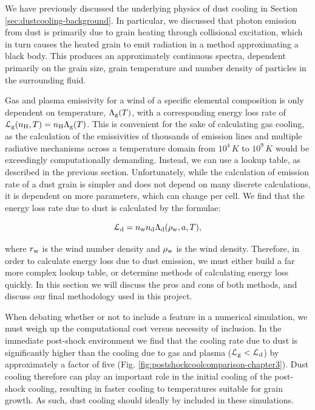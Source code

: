 We have previously discussed the underlying physics of dust cooling in Section \ref{sec:dustcooling-background}.
In particular, we discussed that photon emission from dust is primarily due to grain heating through collisional excitation, which in turn causes the heated grain to emit radiation in a method approximating a black body.
This produces an approximately continuous spectra, dependent primarily on the grain size, grain temperature and number density of particles in the surrounding fluid.

Gas and plasma emissivity for a wind of a specific elemental composition is only dependent on temperature, $\Lambda_\text{g}(T)$, with a corresponding energy loss rate of $\mathcal{L}_\text{g} (n_\text{H},T) = n_\text{H} \Lambda_\text{g}(T)$. 
This is convenient for the sake of calculating gas cooling, as the calculation of the emissivities of thousands of emission lines and multiple radiative mechanisms across a temperature domain from $10^4\, \si{K}$ to $10^9\,\si{K}$ would be exceedingly computationally demanding.
Instead, we can use a lookup table, as described in the previous section.
Unfortunately, while the calculation of emission rate of a dust grain is simpler and does not depend on many discrete calculations, it is dependent on more parameters, which can change per cell.
We find that the energy loss rate due to dust is calculated by the formulae:

\begin{equation}
  \mathcal{L}_\text{d} = n_\text{w} n_\text{d} \Lambda_\text{d}(\rho_\text{w},a,T) ,
\end{equation}

\noindent
where $r_\text{w}$ is the wind number density and $\rho_\text{w}$ is the wind density. 
Therefore, in order to calculate energy loss due to dust emission, we must either build a far more complex lookup table, or determine methods of calculating energy loss quickly.
In this section we will discuss the pros and cons of both methods, and discuss our final methodology used in this project.


When debating whether or not to include a feature in a numerical simulation, we must weigh up the computational cost versus necessity of inclusion.
In the immediate post-shock environment we find that the cooling rate due to dust is significantly higher than the cooling due to gas and plasma ($\mathcal{L}_\text{g} < \mathcal{L}_\text{d}$) by approximately a factor of five (Fig. \ref{fig:postshockcoolcomparison-chapter3}).
Dust cooling therefore can play an important role in the initial cooling of the post-shock cooling, resulting in faster cooling to temperatures suitable for grain growth.
As such, dust cooling should ideally by included in these simulations.

